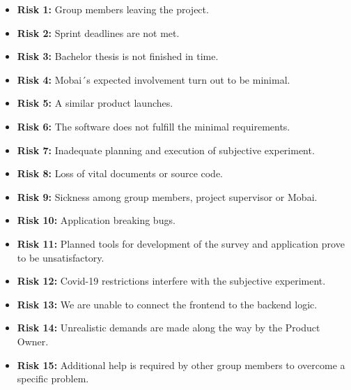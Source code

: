 \begin{itemize}
    \item \textbf{Risk 1:} Group members leaving the project.
    \item \textbf{Risk 2:} Sprint deadlines are not met.
    \item \textbf{Risk 3:} Bachelor thesis is not finished in time.
    \item \textbf{Risk 4:} Mobai´s expected involvement turn out to be minimal. 
    \item \textbf{Risk 5:} A similar product launches.
    \item \textbf{Risk 6:} The software does not fulfill the minimal requirements.
    \item \textbf{Risk 7:} Inadequate planning and execution of subjective experiment.
    \item \textbf{Risk 8:} Loss of vital documents or source code.
    \item \textbf{Risk 9:} Sickness among group members, project supervisor or Mobai.
    \item \textbf{Risk 10:} Application breaking bugs.
    \item \textbf{Risk 11:} Planned tools for development of the survey and application prove to be unsatisfactory. 
    \item \textbf{Risk 12:} Covid-19 restrictions interfere with the subjective experiment. 
    \item \textbf{Risk 13:} We are unable to connect the frontend to the backend logic. 
    \item \textbf{Risk 14:} Unrealistic demands are made along the way by the Product Owner. 
    \item \textbf{Risk 15:} Additional help is required by other group members to overcome a specific problem.
\end{itemize}


\newpage

